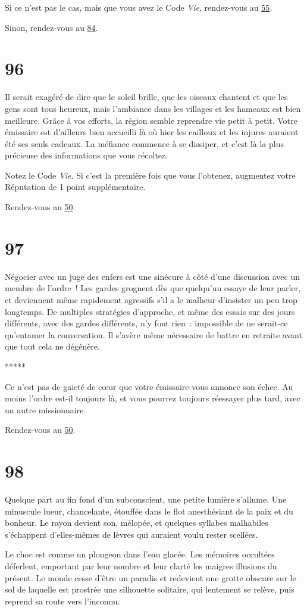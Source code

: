 \documentclass{report}
\newcommand{\gsection}[1]{
    \section{#1}
    \label{section-#1}
}
\newcommand{\glink}[1]{\hyperref[section-#1]{#1}}
\newcommand{\ellipse}{
    \begin{center}
        *****
    \end{center}
}
\begin{document}
Si ce n'est pas le cas, mais que vous avez le Code \emph{Vie}, rendez-vous au \glink{55}.

Sinon, rendez-vous au \glink{84}.

\gsection{96}

Il serait exagéré de dire que le soleil brille, que les oiseaux chantent et que les gens sont tous heureux, mais l'ambiance dans les villages et les hameaux est bien meilleure. Grâce à vos efforts, la région semble reprendre vie petit à petit. Votre émissaire est d'ailleurs bien accueilli là où hier les cailloux et les injures auraient été ses seuls cadeaux. La méfiance commence à se dissiper, et c'est là la plus précieuse des informations que vous récoltez.

Notez le Code \emph{Vie}. Si c'est la première fois que vous l'obtenez, augmentez votre Réputation de 1 point supplémentaire.

Rendez-vous au \glink{50}.

\gsection{97}

Négocier avec un juge des enfers est une sinécure à côté d'une discussion avec un membre de l'ordre ! Les gardes grognent dès que quelqu'un essaye de leur parler, et deviennent même rapidement agressifs s'il a le malheur d'insister un peu trop longtemps. De multiples stratégies d'approche, et même des essais sur des jours différents, avec des gardes différents, n'y font rien : impossible de ne serait-ce qu'entamer la conversation. Il s'avère même nécessaire de battre en retraite avant que tout cela ne dégénère.

\ellipse

Ce n'est pas de gaieté de cœur que votre émissaire vous annonce son échec. Au moins l'ordre est-il toujours là, et vous pourrez toujours réessayer plus tard, avec un autre missionnaire.

Rendez-vous au \glink{50}.

\gsection{98}

Quelque part au fin fond d'un subconscient, une petite lumière s'allume. Une minuscule lueur, chancelante, étouffée dans le flot anesthésiant de la paix et du bonheur. Le rayon devient son, mélopée, et quelques syllabes malhabiles s'échappent d'elles-mêmes de lèvres qui auraient voulu rester scellées.

Le choc est comme un plongeon dans l'eau glacée. Les mémoires occultées déferlent, emportant par leur nombre et leur clarté les maigres illusions du présent. Le monde cesse d'être un paradis et redevient une grotte obscure sur le sol de laquelle est prostrée une silhouette solitaire, qui lentement se relève, puis reprend sa route vers l'inconnu.
\end{document}
